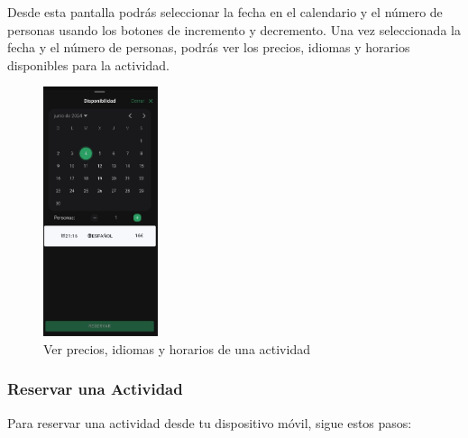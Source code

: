 Desde esta pantalla podrás seleccionar la fecha en el calendario y el número de personas usando los botones de incremento y decremento.
Una vez seleccionada la fecha y el número de personas, podrás ver los precios, idiomas y horarios disponibles para la actividad.
\begin{figure}[H]
	\centering
	\includegraphics[width=0.3\textwidth]{7-Construccion/Manuales/app/P5-Actividad.png}
	\caption{Ver precios, idiomas y horarios de una actividad}
\end{figure}

\subsubsection{Reservar una Actividad}
Para reservar una actividad desde tu dispositivo móvil, sigue estos pasos:

